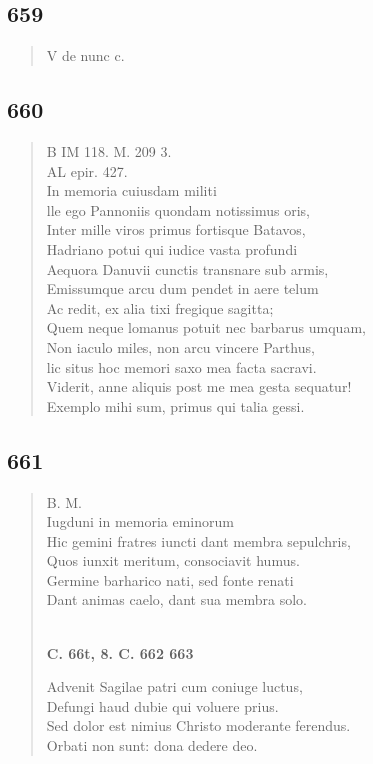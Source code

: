 \documentclass[11pt, a4paper]{report}
\begin{document}
            \subsection*{659}
      \begin{verse}
      V de nunc c. \\ 
      \end{verse}
  
            \subsection*{660}
      \begin{verse}
      B IM 118. M. 209 3. \\ AL epir. 427. \\ In memoria cuiusdam militi \\ lle ego Pannoniis quondam notissimus oris, \\ Inter mille viros primus fortisque Batavos, \\ Hadriano potui qui iudice vasta profundi \\ Aequora Danuvii cunctis transnare sub armis, \\ Emissumque arcu dum pendet in aere telum \\ Ac redit, ex alia tixi fregique sagitta; \\ Quem neque lomanus potuit nec barbarus umquam, \\ Non iaculo miles, non arcu vincere Parthus, \\ lic situs hoc memori saxo mea facta sacravi. \\ Viderit, anne aliquis post me mea gesta sequatur! \\ Exemplo mihi sum, primus qui talia gessi. \\ 
      \end{verse}
  
            \subsection*{661}
      \begin{verse}
      B. M. \\ Iugduni in memoria eminorum \\ Hic gemini fratres iuncti dant membra sepulchris, \\ Quos iunxit meritum, consociavit humus. \\ Germine barharico nati, sed fonte renati \\ Dant animas caelo, dant sua membra solo. \\ 
        ﻿\pagebreak 
     \marginpar{[133]} \begin{center} \textbf{C. 66t, 8. C. 662 663} \end{center}Advenit Sagilae patri cum coniuge luctus, \\ Defungi haud dubie qui voluere prius. \\ Sed dolor est nimius Christo moderante ferendus. \\ Orbati non sunt: dona dedere deo. \\ 
      \end{verse}
  
\end{document}
